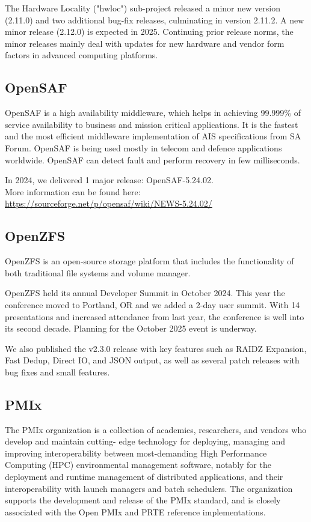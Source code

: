 \documentclass[a4paper]{report}
\begin{document}
The Hardware Locality ("hwloc") sub-project released a minor new version (2.11.0) and two additional bug-fix releases, culminating in version 2.11.2.  A new minor release (2.12.0) is expected in 2025.  Continuing prior release norms, the minor releases mainly deal with updates for new hardware and vendor form factors in advanced computing platforms.

\subsection{OpenSAF}

OpenSAF is a high availability middleware, which helps in achieving 99.999\% of service availability to business and mission critical applications. It is the fastest and the most efficient middleware implementation of AIS specifications from SA Forum. OpenSAF is being used mostly in telecom and defence applications worldwide. OpenSAF can detect fault and perform recovery in few milliseconds.

In 2024, we delivered 1 major release: OpenSAF-5.24.02.\\
More information can be found here: \href{https://sourceforge.net/p/opensaf/wiki/NEWS-5.24.02/}{https://sourceforge.net/p/opensaf/wiki/NEWS-5.24.02/}

\subsection{OpenZFS}

OpenZFS is an open-source storage platform that includes the functionality of both traditional file systems and volume manager.

OpenZFS held its annual Developer Summit in October 2024.  This year the conference moved to Portland, OR and we added a 2-day user summit. With 14 presentations and increased attendance from last year, the conference is well into its second decade. Planning for the October 2025 event is underway.

We also published the v2.3.0 release with key features such as RAIDZ Expansion, Fast Dedup, Direct IO, and JSON output, as well as several patch releases with bug fixes and small features.

\subsection{PMIx}

The PMIx organization is a collection of academics, researchers, and vendors who develop and maintain cutting- edge technology for deploying, managing and improving interoperability between most-demanding High Performance Computing (HPC) environmental management software, notably for the deployment and runtime management of distributed applications, and their interoperability with launch managers and batch schedulers. The organization supports the development and release of the PMIx standard, and is closely associated with the Open PMIx and PRTE reference implementations.
\end{document}
